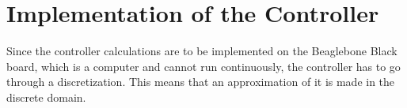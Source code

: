 \section{Implementation of the Controller}\label{impController}
Since the controller calculations are to be implemented on the Beaglebone Black board, which is a computer and cannot run continuously, the controller has to go through a discretization. This means that an approximation of it is made in the discrete domain.